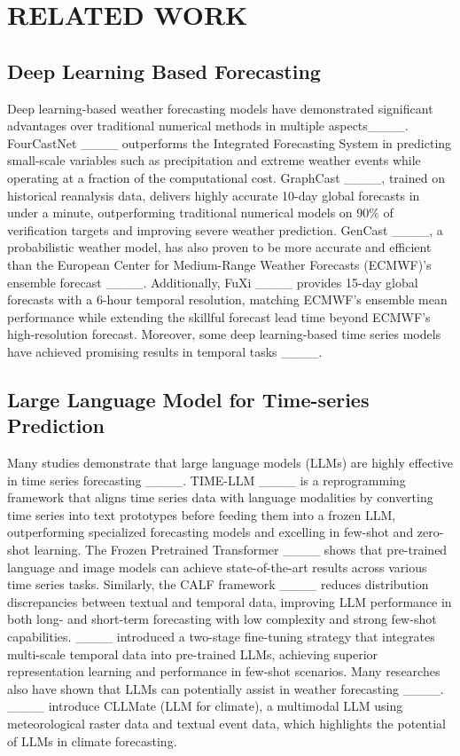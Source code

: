\section{RELATED WORK}
\subsection{Deep Learning Based Forecasting }
Deep learning-based weather forecasting models have demonstrated significant advantages over traditional numerical methods in multiple aspects____. FourCastNet ____ outperforms the Integrated Forecasting System in predicting small-scale variables such as precipitation and extreme weather events while operating at a fraction of the computational cost. GraphCast ____, trained on historical reanalysis data, delivers highly accurate 10-day global forecasts in under a minute, outperforming traditional numerical models on 90\% of verification targets and improving severe weather prediction. GenCast ____, a probabilistic weather model, has also proven to be more accurate and efficient than the European Center for Medium-Range Weather Forecasts (ECMWF)'s ensemble forecast ____. Additionally, FuXi ____ provides 15-day global forecasts with a 6-hour temporal resolution, matching ECMWF’s ensemble mean performance while extending the skillful forecast lead time beyond ECMWF's high-resolution forecast. Moreover, some deep learning-based time series models have achieved promising results in temporal tasks ____.

\subsection{Large Language Model for Time-series Prediction}
Many studies demonstrate that large language models (LLMs) are highly effective in time series forecasting ____. TIME-LLM ____ is a reprogramming framework that aligns time series data with language modalities by converting time series into text prototypes before feeding them into a frozen LLM, outperforming specialized forecasting models and excelling in few-shot and zero-shot learning. The Frozen Pretrained Transformer ____ shows that pre-trained language and image models can achieve state-of-the-art results across various time series tasks. Similarly, the CALF framework ____ reduces distribution discrepancies between textual and temporal data, improving LLM performance in both long- and short-term forecasting with low complexity and strong few-shot capabilities. ____ introduced a two-stage fine-tuning strategy that integrates multi-scale temporal data into pre-trained LLMs, achieving superior representation learning and performance in few-shot scenarios. 
Many researches also have shown that LLMs can potentially assist in weather forecasting ____. ____ introduce CLLMate (LLM for climate), a multimodal LLM using meteorological raster data and textual event data, which highlights the potential of LLMs in climate forecasting.


